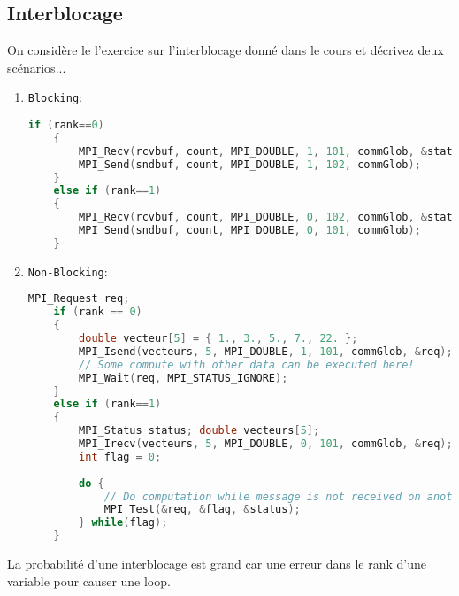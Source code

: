 \documentclass{article}
\begin{document}
\subsection{Interblocage}
\begin{resolution}
    On considère le l'exercice sur l'interblocage donné dans le cours et décrivez deux scénarios...
    \begin{enumerate}
        \item \texttt{Blocking}: 
    \begin{scriptsize}
        \mycode
        \begin{lstlisting}[language=C++]
    if (rank==0)
    {
        MPI_Recv(rcvbuf, count, MPI_DOUBLE, 1, 101, commGlob, &status);
        MPI_Send(sndbuf, count, MPI_DOUBLE, 1, 102, commGlob);
    }
    else if (rank==1)
    {
        MPI_Recv(rcvbuf, count, MPI_DOUBLE, 0, 102, commGlob, &status);
        MPI_Send(sndbuf, count, MPI_DOUBLE, 0, 101, commGlob);
    }
        \end{lstlisting}
    \end{scriptsize}
        \item \texttt{Non-Blocking}: 
    \begin{scriptsize}
        \mycode
        \begin{lstlisting}[language=C++]
    MPI_Request req;
    if (rank == 0)
    {
        double vecteur[5] = { 1., 3., 5., 7., 22. };
        MPI_Isend(vecteurs, 5, MPI_DOUBLE, 1, 101, commGlob, &req);
        // Some compute with other data can be executed here!
        MPI_Wait(req, MPI_STATUS_IGNORE);
    }
    else if (rank==1)
    {
        MPI_Status status; double vecteurs[5];
        MPI_Irecv(vecteurs, 5, MPI_DOUBLE, 0, 101, commGlob, &req);
        int flag = 0;
        
        do {
            // Do computation while message is not received on another data
            MPI_Test(&req, &flag, &status);
        } while(flag);
    }
        \end{lstlisting}
    \end{scriptsize}
    \end{enumerate}
    La probabilité d'une interblocage est grand car une erreur dans le rank d'une variable pour causer une loop.
\end{resolution}
\end{document}
